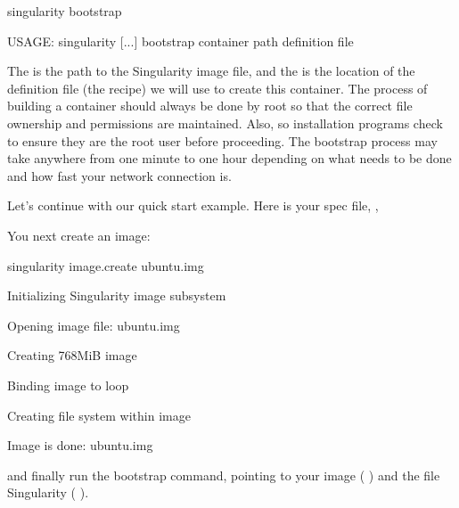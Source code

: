 \documentclass[letterpaper,10pt,english]{sphinxmanual}
\begin{document}
%
\begin{sphinxVerbatim}[commandchars=\\\{\}]
\PYGZdl{} singularity bootstrap

USAGE: singularity [...] bootstrap \PYGZlt{}container path\PYGZgt{} \PYGZlt{}definition file\PYGZgt{}
\end{sphinxVerbatim}

The  is the path to the Singularity image file, and the  is the location
of the definition file (the recipe) we will use to create this
container. The process of building a container should always be done
by root so that the correct file ownership and permissions are
maintained. Also, so installation programs check to ensure they are
the root user before proceeding. The bootstrap process may take
anywhere from one minute to one hour depending on what needs to be
done and how fast your network connection is.

Let’s continue with our quick start example. Here is your spec file,  ,

%
\begin{sphinxVerbatim}[commandchars=\\\{\}]

\end{sphinxVerbatim}

You next create an image:

%
\begin{sphinxVerbatim}[commandchars=\\\{\}]
\PYGZdl{} singularity image.create ubuntu.img

Initializing Singularity image subsystem

Opening image file: ubuntu.img

Creating 768MiB image

Binding image to loop

Creating file system within image

Image is done: ubuntu.img
\end{sphinxVerbatim}

and finally run the bootstrap command, pointing to your image (  ) and
the file Singularity (  ).
\end{document}
